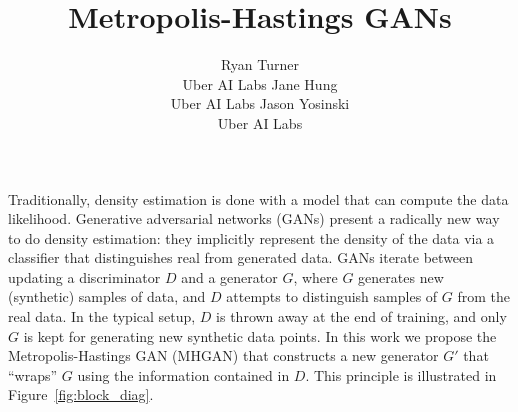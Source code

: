 \documentclass{article}
\title{Metropolis-Hastings GANs}
\author{
  Ryan Turner \\
  Uber AI Labs
  \And
  Jane Hung \\
  Uber AI Labs
  \And
  Jason Yosinski \\
  Uber AI Labs
}
\begin{document}

\maketitle



Traditionally, density estimation is done with a model that can compute the data likelihood.
Generative adversarial networks (GANs) \citep{Goodfellow2014} present a radically new way to do density estimation:
they implicitly represent the density of the data via a classifier that distinguishes real from generated data.
GANs iterate between updating a discriminator $D$ and a generator $G$, where $G$ generates new (synthetic) samples of data, and $D$ attempts to distinguish samples of $G$ from the real data.
In the typical setup, $D$ is thrown away at the end of training, and only $G$ is kept for generating new synthetic data points.
In this work we propose the Metropolis-Hastings GAN (MHGAN) that constructs a new generator $G'$ that ``wraps'' $G$ using the information contained in $D$.
This principle is illustrated in Figure~\ref{fig:block_diag}.
\end{document}

